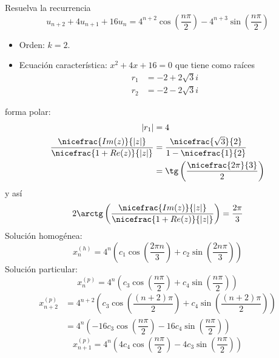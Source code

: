 \begin{ejercicio}
    Resuelva la recurrencia
    \begin{equation*}
        u_{n+2} + 4u_{n+1} + 16u_n = 4^{n+2} \cos \left(\dfrac{n\pi}{2} \right) -4^{n+3} \sin \left(\dfrac{n\pi}{2} \right) 
    \end{equation*}

    \begin{itemize}
        \item Orden: $k = 2$.
        \item Ecuación característica: $x^2 + 4x + 16 = 0$ 
            que tiene como raíces
            \begin{align*}
                r_1 &= -2 + 2\sqrt{3}i \\
                r_2 &= -2 -2\sqrt{3}i 
            \end{align*}
    \end{itemize}
    forma polar:
    \begin{align*}
        |r_1| &= 4 \\
        \dfrac{\nicefrac{Im(z)}{|z|}}{\nicefrac{1 + Re(z)}{|z|}} &= \dfrac{\nicefrac{\sqrt{3}}{2}}{1-\nicefrac{1}{2}} \\
                                                                  &= \tg \left(\dfrac{\nicefrac{2\pi}{3}}{2} \right) 
    \end{align*}
    y así 
    \begin{equation*}
        2 \arctg \left(\dfrac{\nicefrac{Im(z)}{|z|}}{\nicefrac{1 + Re(z)}{|z|}}  \right) = \dfrac{2\pi}{3} 
    \end{equation*}
    Solución homogénea:
    \begin{equation*}
        x_n^{(h)} = 4^n \left(c_1 \cos \left(\dfrac{2\pi n}{3}\right) + c_2 \sin \left(\dfrac{2n\pi}{3} \right)  \right) 
    \end{equation*}
    Solución particular:
    \begin{equation*}
        x_n^{(p)} = 4^n \left( c_3 \cos \left(\dfrac{n\pi}{2} \right) + c_4 \sin \left(\dfrac{n\pi}{2} \right)  \right)
    \end{equation*}
    \begin{align*}
        x_{n+2}^{(p)} &= 4^{n+2} \left(c_3 \cos \left(\dfrac{(n+2)\pi}{2}\right) +c_4 \sin \left(\dfrac{(n+2)\pi}{2} \right) \right) \\
                      &= 4^n \left(-16c_3 \cos \left(\dfrac{n\pi}{2} \right)  -16 c_4 \sin \left(\dfrac{n\pi}{2} \right) \right) 
    \end{align*} 
    \begin{equation*}
        x_{n+1}^{(p)} = 4^n \left(4c_4 \cos \left(\dfrac{n\pi}{2} \right) -4 c_3 \sin \left(\dfrac{n\pi}{2} \right) \right) 
    \end{equation*}
\end{ejercicio}


